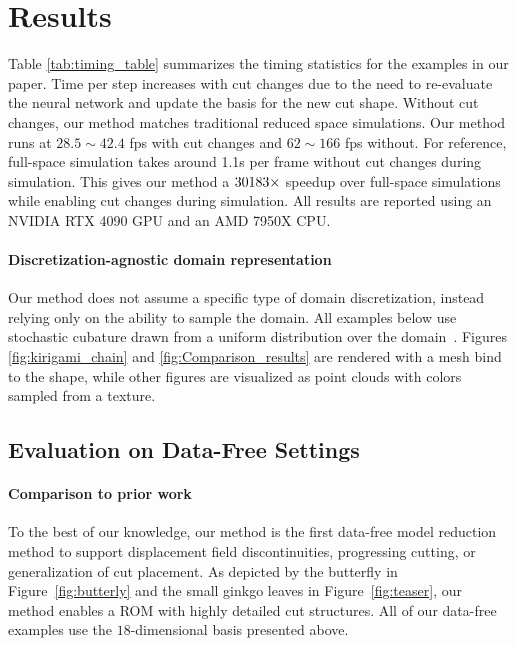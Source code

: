\section{Results}


Table \ref{tab:timing_table} summarizes the timing statistics for the examples in our paper. Time per step increases with cut changes due to the need to re-evaluate the neural network and update the basis for the new cut shape. Without cut changes, our method matches traditional reduced space simulations. Our method runs at $28.5 \sim 42.4$ fps with cut changes and $62 \sim 166$ fps without. For reference, full-space simulation takes around 1.1s per frame without cut changes during simulation. This gives our method a $30\time \sim 183\times$ speedup over full-space simulations while enabling cut changes during simulation. All results are reported using an NVIDIA RTX 4090 GPU and an AMD 7950X CPU.

\paragraph{Discretization-agnostic domain representation} Our method does not assume a specific type of domain discretization, instead relying only on the ability to sample the domain. All examples below use stochastic cubature drawn from a uniform distribution over the domain~\cite{chang:2023:licrom,Modi:2024:Simplicits}. Figures \ref{fig:kirigami_chain} and \ref{fig:Comparison_results} are rendered with a mesh bind to the shape, while other figures are visualized as point clouds with colors sampled from a texture.



\subsection{Evaluation on Data-Free Settings}

\paragraph{Comparison to prior work}
To the best of our knowledge, our method is the first data-free model reduction method to support displacement field discontinuities, progressing cutting, or generalization of cut placement. As depicted by the butterfly in Figure~\ref{fig:butterly} and the small ginkgo leaves in Figure~\ref{fig:teaser}, our method enables a ROM with highly detailed cut structures. All of our data-free examples use the $18$-dimensional basis presented above. 



